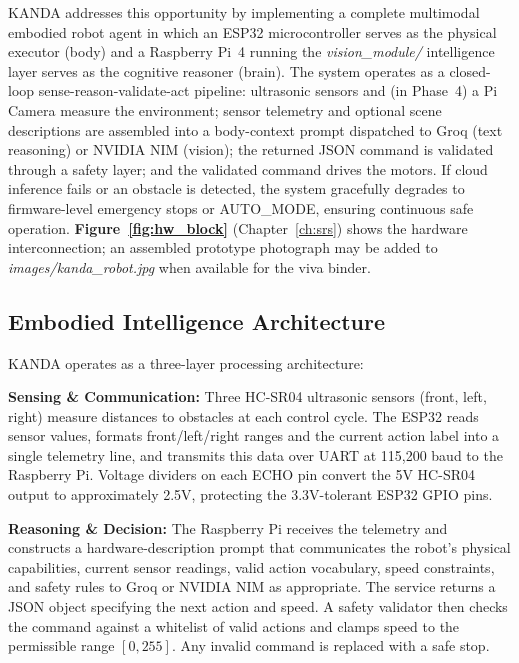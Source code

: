 KANDA addresses this opportunity by implementing a complete multimodal embodied robot agent in which an ESP32 microcontroller serves as the physical executor (body) and a Raspberry Pi~4 running the \textit{vision\_module/} intelligence layer serves as the cognitive reasoner (brain). The system operates as a closed-loop sense-reason-validate-act pipeline: ultrasonic sensors and (in Phase~4) a Pi Camera measure the environment; sensor telemetry and optional scene descriptions are assembled into a body-context prompt dispatched to Groq (text reasoning) or NVIDIA NIM (vision); the returned JSON command is validated through a safety layer; and the validated command drives the motors. If cloud inference fails or an obstacle is detected, the system gracefully degrades to firmware-level emergency stops or AUTO\_MODE, ensuring continuous safe operation. \textbf{Figure~\ref{fig:hw_block}} (Chapter~\ref{ch:srs}) shows the hardware interconnection; an assembled prototype photograph may be added to \textit{images/kanda\_robot.jpg} when available for the viva binder.


\subsection{Embodied Intelligence Architecture}
\label{subsec:architecture}

KANDA operates as a three-layer processing architecture:

\textbf{Sensing \& Communication:}
Three HC-SR04 ultrasonic sensors (front, left, right) measure distances to obstacles at each control cycle. The ESP32 reads sensor values, formats front/left/right ranges and the current action label into a single telemetry line, and transmits this data over UART at 115,200 baud to the Raspberry Pi. Voltage dividers on each ECHO pin convert the 5V HC-SR04 output to approximately 2.5V, protecting the 3.3V-tolerant ESP32 GPIO pins.

\textbf{Reasoning \& Decision:}
The Raspberry Pi receives the telemetry and constructs a hardware-description prompt that communicates the robot's physical capabilities, current sensor readings, valid action vocabulary, speed constraints, and safety rules to Groq or NVIDIA NIM as appropriate. The service returns a JSON object specifying the next action and speed. A safety validator then checks the command against a whitelist of valid actions and clamps speed to the permissible range $[0, 255]$. Any invalid command is replaced with a safe stop.

